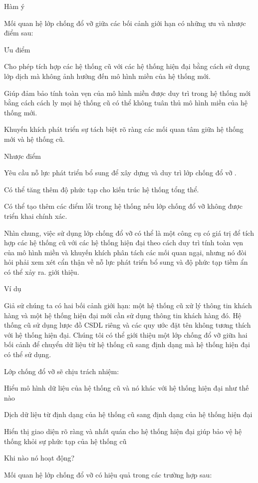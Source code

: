 Hàm ý

Mối quan hệ lớp chống đổ vỡ giữa các bối cảnh giới hạn có những ưu và nhược điểm sau:

Ưu điểm

Cho phép tích hợp các hệ thống cũ với các hệ thống hiện đại bằng cách sử dụng lớp dịch mà không ảnh hưởng đến mô hình miền của hệ thống mới.

Giúp đảm bảo tính toàn vẹn của mô hình miền được duy trì trong hệ thống mới bằng cách cách ly mọi hệ thống cũ có thể không tuân thủ mô hình miền của hệ thống mới.

Khuyến khích phát triển sự tách biệt rõ ràng các mối quan tâm giữa hệ thống mới và hệ thống cũ.

Nhược điểm

Yêu cầu nỗ lực phát triển bổ sung để xây dựng và duy trì lớp chống đổ vỡ .

Có thể tăng thêm độ phức tạp cho kiến trúc hệ thống tổng thể.

Có thể tạo thêm các điểm lỗi trong hệ thống nếu lớp chống đổ vỡ không được triển khai chính xác.

Nhìn chung, việc sử dụng lớp chống đổ vỡ có thể là một công cụ có giá trị để tích hợp các hệ thống cũ với các hệ thống hiện đại theo cách duy trì tính toàn vẹn của mô hình miền và khuyến khích phân tách các mối quan ngại, nhưng nó đòi hỏi phải xem xét cẩn thận về nỗ lực phát triển bổ sung và độ phức tạp tiềm ẩn có thể xảy ra. giới thiệu.

Ví dụ

Giả sử chúng ta có hai bối cảnh giới hạn: một hệ thống cũ xử lý thông tin khách hàng và một hệ thống hiện đại mới cần sử dụng thông tin khách hàng đó. Hệ thống cũ sử dụng lược đồ CSDL riêng và các quy ước đặt tên không tương thích với hệ thống hiện đại. Chúng tôi có thể giới thiệu một lớp chống đổ vỡ giữa hai bối cảnh để chuyển dữ liệu từ hệ thống cũ sang định dạng mà hệ thống hiện đại có thể sử dụng.

Lớp chống đổ vỡ sẽ chịu trách nhiệm:

Hiểu mô hình dữ liệu của hệ thống cũ và nó khác với hệ thống hiện đại như thế nào

Dịch dữ liệu từ định dạng của hệ thống cũ sang định dạng của hệ thống hiện đại

Hiển thị giao diện rõ ràng và nhất quán cho hệ thống hiện đại giúp bảo vệ hệ thống khỏi sự phức tạp của hệ thống cũ

Khi nào nó hoạt động?

Mối quan hệ lớp chống đổ vỡ có hiệu quả trong các trường hợp sau:


